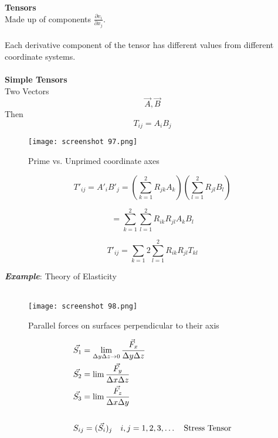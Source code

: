 \documentclass[svgnames]{article}   	%
\begin{document}
\textbf{Tensors} 
\mbox{}\\
Made up of components $ \frac{\partial v_i}{\partial x_j} $.
\\\\ Each derivative component of the tensor has different values from different coordinate systems. 
\mbox{}\\\\
\textbf{Simple Tensors}
\mbox{}\\

Two Vectors
\[ \vec{A}, \vec{B} \]
Then 
\[
  T_{ij} = A_i B_j 
\]

\begin{figure}[H]
  \centering
    \texttt{[image: screenshot 97.png]}
    \caption{Prime vs. Unprimed coordinate axes}
\end{figure}



\[
  T'_{ij} = A'_i B'_j = \left(\sum_{k=1}^2 R_{jk} A_k \right)\left( \sum_{l
  = 1}^2 R_{jl} B_l \right)
\]

\[
  = \sum_{k=1}^2 \sum_{l=1}^2 R_{ik} R_{jl} A_k B_l
\]

\begin{tcolorbox}[title = Tensor Transformation Law]

\[
  T'_{ij} = \sum_{k=1}{2} \sum_{l=1}^{2} R_{ik} R_{jl} T_{kl}
\]

\end{tcolorbox} 
\vspace{10px} 
\textit{ \textbf{Example}}: Theory of Elasticity 
\\\\


\begin{figure}[H]
  \centering
    \texttt{[image: screenshot 98.png]}
    \caption{Parallel forces on surfaces perpendicular to their axis}
\end{figure}



\begin{align*}
  &\vec{S_1} = \lim_{\Delta y \Delta z \to 0} \frac{\vec{F}_x}{\Delta y \Delta 
  z} \\
  &\vec{S_2} = \lim \frac{\vec{F_y}}{\Delta x \Delta z}\\
  &\vec{S_3} = \lim \frac{\vec{F_z}}{\Delta x \Delta y} \\\\
  & S_{ij} = (\vec{S_i})_j \hspace{10px} i,j = 1,2,3,\dots \hspace{10px}
  \text{Stress Tensor} 
\end{align*}
\end{document}
